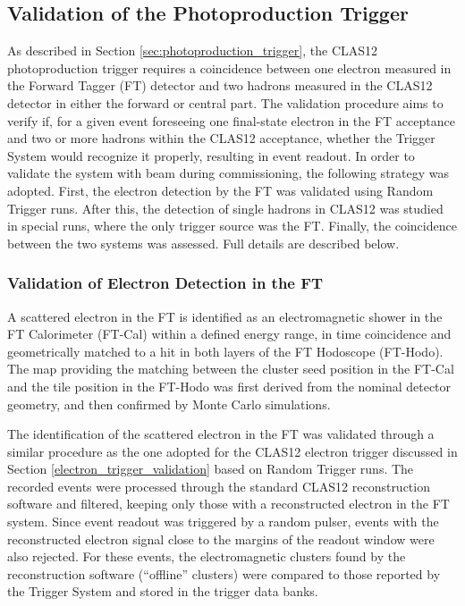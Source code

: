 \subsection{Validation of the Photoproduction Trigger}

As described in Section \ref{sec:photoproduction_trigger}, the CLAS12 photoproduction trigger requires a
coincidence between one electron measured in the Forward Tagger (FT) detector and two hadrons measured
in the CLAS12 detector in either the forward or central part. The validation procedure aims to verify if, for
a given event foreseeing one final-state electron in the FT acceptance and two or more hadrons within the
CLAS12 acceptance, whether the Trigger System would recognize it properly, resulting in event readout. In
order to validate the system with beam during commissioning, the following strategy was adopted. First, the
electron detection by the FT was validated using Random Trigger runs. After this, the detection of single
hadrons in CLAS12 was studied in special runs, where the only trigger source was the FT. Finally, the
coincidence between the two systems was assessed. Full details are described below.

\subsubsection{Validation of Electron Detection in the FT}

A scattered electron in the FT is identified as an electromagnetic shower in the FT Calorimeter (FT-Cal) within
a defined energy range, in time coincidence and geometrically matched to a hit in both layers of the FT
Hodoscope (FT-Hodo). The map providing the matching between the cluster seed position in the FT-Cal and the
tile position in the FT-Hodo was first derived from the nominal detector geometry, and then confirmed by Monte
Carlo simulations.

The identification of the scattered electron in the FT was validated through a similar procedure as the one
adopted for the CLAS12 electron trigger discussed in Section \ref{electron_trigger_validation} based on
Random Trigger runs. The recorded events were processed through the standard CLAS12 reconstruction
software and filtered, keeping only those with a reconstructed electron in the FT system. Since event readout
was triggered by a random pulser, events with the reconstructed electron signal close to the margins of the
readout window were also rejected. For these events, the electromagnetic clusters found by the reconstruction
software (``offline'' clusters) were compared to those reported by the Trigger System and stored in the
trigger data banks.


